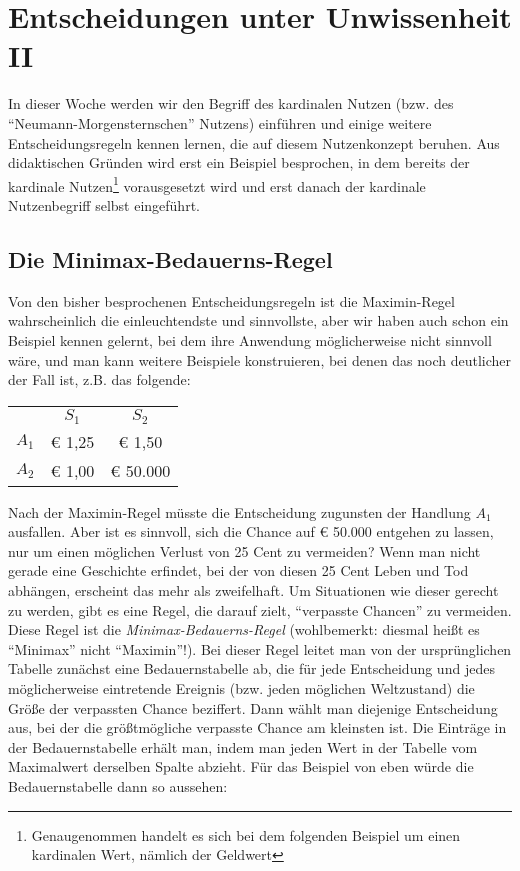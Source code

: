 \section{Entscheidungen unter Unwissenheit II}

In dieser Woche werden wir den Begriff des kardinalen Nutzen (bzw. des
"`Neumann-Morgensternschen"' Nutzens) einführen und einige weitere
Entscheidungsregeln kennen lernen, die auf diesem Nutzenkonzept beruhen. Aus
didaktischen Gründen wird erst ein Beispiel besprochen, in dem bereits der
kardinale Nutzen\footnote{Genaugenommen handelt es sich bei dem folgenden
Beispiel um einen kardinalen Wert, nämlich der Geldwert} vorausgesetzt wird und
erst danach der kardinale Nutzenbegriff selbst eingeführt.

\subsection{Die Minimax-Bedauerns-Regel}
\label{MinimaxRegret}

Von den bisher besprochenen Entscheidungsregeln ist die Maximin-Regel
wahrscheinlich die einleuchtendste und sinnvollste, aber wir haben auch schon
ein Beispiel kennen gelernt, bei dem ihre Anwendung möglicherweise nicht
sinnvoll wäre, und man kann weitere Beispiele konstruieren, bei denen das noch
deutlicher der Fall ist, z.B. das folgende:

\begin{center}
\label{MinimaxBedauernsRegel}
\begin{tabular}{c|c|c|}
\multicolumn{1}{c}{} & \multicolumn{1}{c}{$S_1$} & \multicolumn{1}{c}{$S_2$} \\
\cline{2-3}
$A_1$ & € 1,25 & € 1,50 \\ \cline{2-3}
$A_2$ & € 1,00 & € 50.000 \\ \cline{2-3}
\end{tabular}
\end{center}

Nach der Maximin-Regel müsste die Entscheidung zugunsten der Handlung $A_1$
ausfallen. Aber ist es sinnvoll, sich die Chance auf € 50.000 entgehen zu lassen,
nur um einen möglichen Verlust von 25 Cent zu vermeiden? Wenn man nicht gerade
eine Geschichte erfindet, bei der von diesen 25 Cent Leben und Tod abhängen,
erscheint das mehr als zweifelhaft.  Um
Situationen wie dieser gerecht zu werden, gibt es eine Regel, die darauf zielt,
"`verpasste Chancen"' zu vermeiden. Diese Regel ist die {\em
Minimax-Bedauerns-Regel} (wohlbemerkt: diesmal heißt es "`Minimax"' nicht
"`Maximin"'!). Bei dieser Regel leitet man von der ursprünglichen Tabelle
zunächst eine Bedauernstabelle ab, die für jede Entscheidung und jedes
möglicherweise eintretende Ereignis (bzw. jeden möglichen Weltzustand) die Größe
der verpassten Chance beziffert. Dann wählt man diejenige Entscheidung aus, bei
der die größtmögliche verpasste Chance am kleinsten ist. Die Einträge in der
Bedauernstabelle erhält man, indem man jeden Wert in der Tabelle vom Maximalwert
derselben Spalte abzieht. Für das Beispiel von eben würde die Bedauernstabelle
dann so aussehen:

